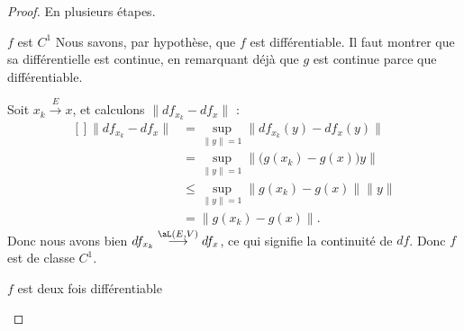 \begin{proof}
    En plusieurs étapes.
    \begin{subproof}
        \item[\( f\) est \( C^1\)]
            Nous savons, par hypothèse, que \( f\) est différentiable. Il faut montrer que sa différentielle est continue, en remarquant déjà que \( g\) est continue parce que différentiable.

            Soit \( x_k\stackrel{E}{\longrightarrow}x\), et calculons \( \| df_{x_k}-df_x \|\) :
            \begin{equation}
                \begin{aligned}[]
                    \| df_{x_k}-df_x \|&=\sup_{\| y \|=1}\| df_{x_k}(y)-df_x(y) \|\\
                    &=\sup_{\| y \|=1}\| \big(g(x_k)-g(x)\big)y \|\\
                    &\leq\sup_{\| y \|=1}\| g(x_k)-g(x) \|\| y \|\\
                    &=\| g(x_k)-g(x) \|.
                \end{aligned}
            \end{equation}
            Donc nous avons bien \(df_{x_k}\stackrel{\aL(E,V)}{\longrightarrow}df_x\), ce qui signifie la continuité de \( df\). Donc \( f\) est de classe \( C^1\).

        \item[\( f\) est deux fois différentiable]


\end{subproof}
\end{proof}
